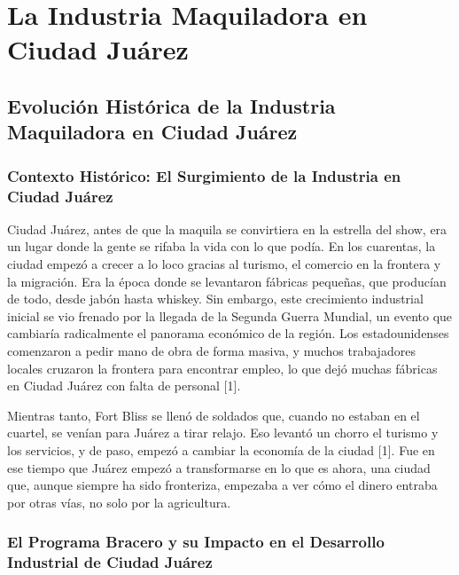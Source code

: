 \documentclass[
  10pt,
  letterpaper,
]{book}
\begin{document}
\chapter{La Industria Maquiladora en Ciudad
Juárez}\label{la-industria-maquiladora-en-ciudad-juuxe1rez}

\section{Evolución Histórica de la Industria Maquiladora en Ciudad
Juárez}\label{evoluciuxf3n-histuxf3rica-de-la-industria-maquiladora-en-ciudad-juuxe1rez}

\subsection{Contexto Histórico: El Surgimiento de la Industria en Ciudad
Juárez}\label{contexto-histuxf3rico-el-surgimiento-de-la-industria-en-ciudad-juuxe1rez}

Ciudad Juárez, antes de que la maquila se convirtiera en la estrella del
show, era un lugar donde la gente se rifaba la vida con lo que podía. En
los cuarentas, la ciudad empezó a crecer a lo loco gracias al turismo,
el comercio en la frontera y la migración. Era la época donde se
levantaron fábricas pequeñas, que producían de todo, desde jabón hasta
whiskey. Sin embargo, este crecimiento industrial inicial se vio frenado
por la llegada de la Segunda Guerra Mundial, un evento que cambiaría
radicalmente el panorama económico de la región. Los estadounidenses
comenzaron a pedir mano de obra de forma masiva, y muchos trabajadores
locales cruzaron la frontera para encontrar empleo, lo que dejó muchas
fábricas en Ciudad Juárez con falta de personal {[}1{]}.

Mientras tanto, Fort Bliss se llenó de soldados que, cuando no estaban
en el cuartel, se venían para Juárez a tirar relajo. Eso levantó un
chorro el turismo y los servicios, y de paso, empezó a cambiar la
economía de la ciudad {[}1{]}. Fue en ese tiempo que Juárez empezó a
transformarse en lo que es ahora, una ciudad que, aunque siempre ha sido
fronteriza, empezaba a ver cómo el dinero entraba por otras vías, no
solo por la agricultura.

\subsection{El Programa Bracero y su Impacto en el Desarrollo Industrial
de Ciudad
Juárez}\label{el-programa-bracero-y-su-impacto-en-el-desarrollo-industrial-de-ciudad-juuxe1rez}
\end{document}
